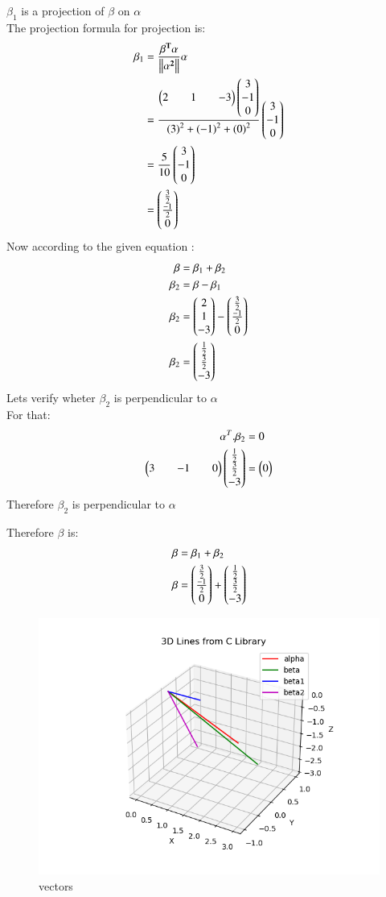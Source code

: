 \documentclass[journal]{IEEEtran}
\theoremstyle{remark}
\begin{document}
$\beta_1$ is a projection of $\beta$ on $\alpha$\\
The projection formula for projection is: 
\begin{align}
\beta_1&=\frac{\mathbf{\beta^T}\mathbf{\alpha}}{\left\lVert\mathbf{\alpha^2}\right\rVert}\mathbf{\alpha}\\
&=\frac{\begin{pmatrix}2&&1&&-3\end{pmatrix}\begin{pmatrix}3\\-1\\0\end{pmatrix}}{\left(3\right)^2+\left(-1\right)^2+\left(0\right)^2}\begin{pmatrix}3\\-1\\0\end{pmatrix}\\
&=\frac{5}{10}\begin{pmatrix}3\\-1\\0\end{pmatrix}\\
&=\begin{pmatrix}\frac{3}{2}\\ \frac{-1}{2}\\ 0\end{pmatrix}
\end{align}
Now according to the given equation :
\begin{align}
    \beta&=\beta_1+\beta_2\\
    \beta_2&=\beta-\beta_1\\
    \beta_2&=\begin{pmatrix}2\\1\\-3\end{pmatrix}-\begin{pmatrix}\frac{3}{2}\\ \frac{-1}{2}\\0\end{pmatrix}\\
    \beta_2&=\begin{pmatrix}\frac{1}{2}\\ \frac{3}{2}\\-3\end{pmatrix}
\end{align}
Lets verify wheter $\beta_2$ is perpendicular to $\alpha$\\
For that:
\begin{align}
    \alpha^T.\beta_2&=0\\
    \begin{pmatrix}3&&-1&&0\end{pmatrix}\begin{pmatrix}\frac{1}{2}\\ \frac{3}{2}\\-3\end{pmatrix}&=\begin{pmatrix}0\end{pmatrix}
\end{align}
Therefore $\beta_2$ is perpendicular to $\alpha$

Therefore $\beta$ is:
\begin{align}
    \beta&=\beta_1+\beta_2\\
    \beta&=\begin{pmatrix}\frac{3}{2}\\ \frac{-1}{2}\\0\end{pmatrix}+\begin{pmatrix}\frac{1}{2}\\ \frac{3}{2}\\-3\end{pmatrix}
\end{align}

\begin{figure}[H]
    \centering
    \includegraphics[width=0.9\columnwidth]{figs/fig2.png}
    \caption{vectors}
    \label{fig:placeholder_1}
\end{figure}
\end{document}
